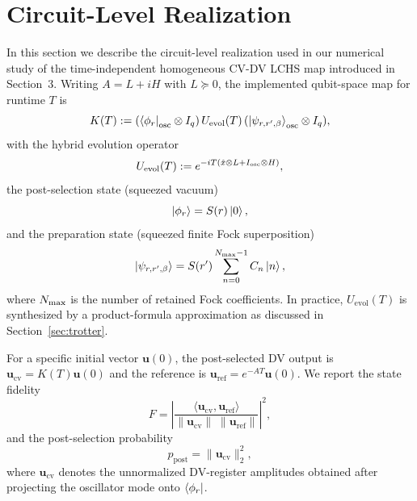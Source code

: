 \documentclass{article}
\begin{document}
\section{Circuit-Level Realization}

In this section we describe the circuit-level realization used in our numerical study of the time-independent homogeneous CV-DV LCHS map introduced in Section~3.
Writing $A=L+iH$ with $L \succeq 0$, the implemented qubit-space map for runtime $T$ is
\begin{equation}
K(T):=
(\bra{\phi_r}_{\rm osc}\otimes I_q)\,
U_{\mathrm{evol}}(T)\,
(\ket{\psi_{r,r',\beta}}_{\rm osc}\otimes I_q),
\label{eq:impl-map}
\end{equation}
with the hybrid evolution operator
\begin{equation}
U_{\mathrm{evol}}(T):=
e^{-iT(\hat{x}\otimes L+I_{\rm osc}\otimes H)},
\label{eq:impl-uevol}
\end{equation}
the post-selection state (squeezed vacuum)
\begin{equation}
\ket{\phi_r}=S(r)\ket{0},
\label{eq:impl-post}
\end{equation}
and the preparation state (squeezed finite Fock superposition)
\begin{equation}
\ket{\psi_{r,r',\beta}}=S(r')\sum_{n=0}^{N_{\rm max}-1} C_n\ket{n},
\label{eq:impl-prep}
\end{equation}
where $N_{\rm max}$ is the number of retained Fock coefficients.
In practice, $U_{\mathrm{evol}}(T)$ is synthesized by a product-formula approximation as discussed in Section~\ref{sec:trotter}.

For a specific initial vector $\bm{u}(0)$, the post-selected DV output is
$\bm{u}_{\mathrm{cv}}=K(T)\bm{u}(0)$ and the reference is
$\bm{u}_{\mathrm{ref}}=e^{-AT}\bm{u}(0)$.
We report the state fidelity
\begin{equation}
F=\left|\frac{\langle\bm{u}_{\mathrm{cv}},\bm{u}_{\mathrm{ref}}\rangle}
{\|\bm{u}_{\mathrm{cv}}\|\;\|\bm{u}_{\mathrm{ref}}\|}\right|^2,
\label{eq:impl-fidelity}
\end{equation}
and the post-selection probability
\begin{equation}
p_{\mathrm{post}}=\|\bm{u}_{\mathrm{cv}}\|_2^2,
\label{eq:impl-ppost}
\end{equation}
where $\bm{u}_{\mathrm{cv}}$ denotes the unnormalized DV-register amplitudes obtained after projecting
the oscillator mode onto $\bra{\phi_r}$.
\end{document}
